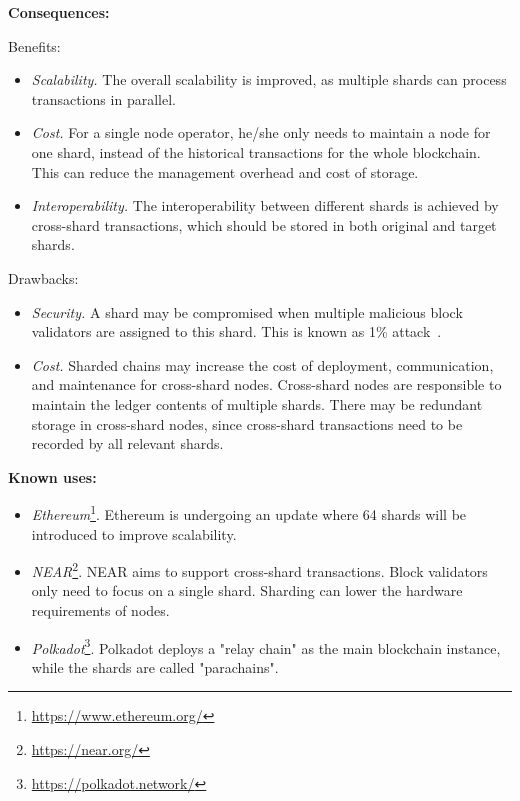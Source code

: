\documentclass{article}
\begin{document}
\vspace{0.5em}\noindent \textbf{Consequences:} 

Benefits:
\begin{itemize}
  \item \textit{Scalability.} The overall scalability is improved, as multiple shards can process transactions in parallel.
  
  \item \textit{Cost.} For a single node operator, he/she only needs to maintain a node for one shard, instead of the historical transactions for the whole blockchain. This can reduce the management overhead and cost of storage.
  
  \item \textit{Interoperability.} The interoperability between different shards is achieved by cross-shard transactions, which should be stored in both original and target shards.
  
\end{itemize}

Drawbacks:
\begin{itemize}
  \item \textit{Security.} A shard may be compromised when multiple malicious block validators are assigned to this shard. This is known as 1\% attack~\cite{single_shard_attack}.

  \item \textit{Cost.} Sharded chains may increase the cost of deployment, communication, and maintenance for cross-shard nodes. Cross-shard nodes are responsible to maintain the ledger contents of multiple shards. There may be redundant storage in cross-shard nodes, since cross-shard transactions need to be recorded by all relevant shards.

\end{itemize}


\vspace{0.5em}\noindent \textbf{Known uses:}  
 \begin{itemize}
   \item \textit{Ethereum}\footnote{\url{https://www.ethereum.org/}\label{ethereum}}. Ethereum is undergoing an update where 64 shards will be introduced to improve scalability.
   
   \item \textit{NEAR}\footnote{\url{https://near.org/}}. NEAR aims to support cross-shard transactions. Block validators only need to focus on a single shard. Sharding can lower the hardware requirements of nodes.
   
   \item \textit{Polkadot}\footnote{\url{https://polkadot.network/}}. Polkadot deploys a "relay chain" as the main blockchain instance, while the shards are called "parachains".

 \end{itemize}
\end{document}
